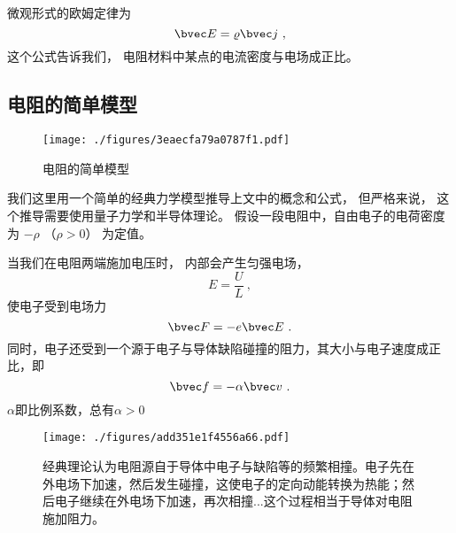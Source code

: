 微观形式的欧姆定律为
\begin{equation}
\bvec E = \varrho\bvec j~,
\end{equation}
这个公式告诉我们， 电阻材料中某点的电流密度与电场成正比。

\subsection{电阻的简单模型}
\begin{figure}[ht]
\centering
\texttt{[image: ./figures/3eaecfa79a0787f1.pdf]}
\caption{电阻的简单模型} \label{fig_Resist_1}
\end{figure}

我们这里用一个简单的经典力学模型推导上文中的概念和公式， 但严格来说， 这个推导需要使用量子力学和半导体理论。 假设一段电阻中，自由电子的电荷密度为 $-\rho$ （$\rho > 0$） 为定值。

当我们在电阻两端施加电压时， 内部会产生匀强电场，
\begin{equation}\label{eq_Resist_6}
E = \frac UL~,
\end{equation}
使电子受到电场力
\begin{equation}
\bvec F = -e\bvec E~.
\end{equation}
同时，电子还受到一个源于电子与导体缺陷碰撞的阻力，其大小与电子速度成正比，即
\begin{equation}
\bvec f = -\alpha \bvec v~.
\end{equation}
$\alpha$即比例系数，总有$\alpha>0$

\begin{figure}[ht]
\centering
\texttt{[image: ./figures/add351e1f4556a66.pdf]}
\caption{经典理论认为电阻源自于导体中电子与缺陷等的频繁相撞。电子先在外电场下加速，然后发生碰撞，这使电子的定向动能转换为热能；然后电子继续在外电场下加速，再次相撞...这个过程相当于导体对电阻施加阻力。} \label{fig_Resist_4}
\end{figure}

